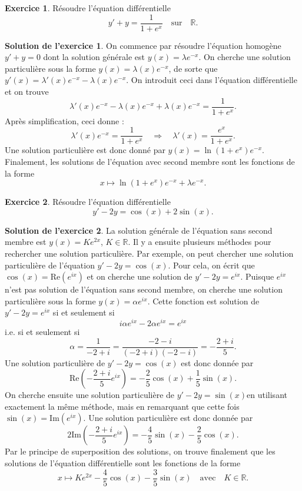 \documentclass[a4paper, 11pt,openany]{article}%
\theoremstyle{plain}
\theoremstyle{definition}
\newtheorem{exo}{Exercice}
\newtheorem{sol}{Solution de l'exercice}
\theoremstyle{remark}
\newcommand{\R}{\mathbb{R}}
\begin{document}
\begin{exo}
Résoudre l'équation différentielle
\[ y'+y = \frac{1}{1+e^x} \quad \text{sur} \quad \R.\]
\end{exo}

\begin{sol}
On commence par résoudre l'équation homogène $y'+y=0$ dont la solution générale est $y(x)=\lambda e^{-x}$. On cherche une solution particulière sous la forme $y(x)= \lambda(x)e^{-x}$, de sorte que $y'(x)=\lambda'(x)e^{-x} - \lambda(x) e^{-x}$. On introduit ceci dans l'équation différentielle et on trouve 
\[ \lambda'(x)e^{-x} - \lambda (x) e^{-x}+\lambda(x)e^{-x}= \frac{1}{1+e^x}.\]
Après simplification, ceci donne : 
\[ \lambda'(x)e^{-x}= \frac{1}{1+e^x} \quad \Rightarrow \quad \lambda'(x)=\frac{e^x}{1+e^x}.\]
Une solution particulière est donc donné par $y(x)=\ln(1+e^x)e^{-x}$. Finalement, les solutions de l'équation avec second membre sont les fonctions de la forme
\[ x \mapsto\ln(1+e^x)e^{-x}+\lambda e^{-x}.\]
\end{sol}


\begin{exo}
Résoudre l'équation différentielle
\[ y'-2y = \cos(x) + 2 \sin(x).\]
\end{exo}


\begin{sol}
La solution générale de l'équation sans second membre est $y(x)=Ke^{2x}$, $K \in \R$. Il y a ensuite plusieurs méthodes pour rechercher une solution particulière. Par exemple, on peut chercher une solution particulière de l'équation $y'-2y=\cos(x)$. Pour cela, on écrit que $\cos(x)=\text{Re}(e^{ix})$ et on cherche une solution de $y'-2y=e^{ix}$. Puisque $e^{ix}$ n'est pas solution de l'équation sans second membre, on cherche une solution particulière sous la forme $y(x)= \alpha e^{ix}$. Cette fonction est solution de $y'-2y=e^{ix}$ si et seulement si 
\[ i \alpha e^{ix} -2 \alpha e^{ix}=e^{ix}\] 
i.e. si et seulement si
\[ \alpha =\frac{1}{-2+i}=\frac{-2-i}{(-2+i)(-2-i)}=-\frac{2+i}{5}.\]
Une solution particulière de $y'-2y=\cos(x)$ est donc donnée par \[ \text{Re}\left(- \frac{2+i}{5} e^{ix} \right)=- \frac{2}{5} \cos(x) + \frac{1}{5} \sin(x).\]
On cherche ensuite une solution particulière de $y'-2y=\sin(x)$en utilisant exactement la même méthode, mais en remarquant que cette fois $\sin(x)=\text{Im}(e^{ix})$. Une solution particulière est donc donnée par \[ 2\text{Im}\left( -\frac{2+i}{5} e^{ix} \right)=-\frac{4}{5}\sin(x)-\frac{2}{5}\cos(x).\] Par le principe de superposition des solutions, on trouve finalement que les solutions de l'équation différentielle sont les fonctions de la forme
\[ x \mapsto Ke^{2x}- \frac{4}{5}\cos(x)- \frac{3}{5} \sin(x) \quad \text{avec} \quad K\in \R.\]
\end{sol}
\end{document}
